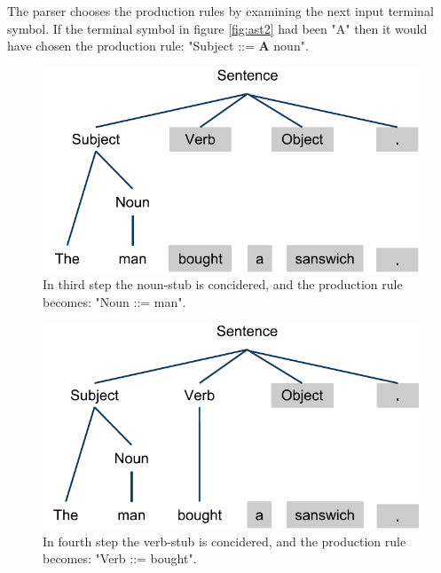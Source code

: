 The parser chooses the production rules by examining the next input terminal symbol. If the terminal symbol in figure \ref{fig:ast2} had been "A" then it would have chosen the production rule: "Subject ::= \textbf{A} noun".

\begin{figure}[H]
\begin{center}
\includegraphics[scale=0.5]{Images/parsingexample/AST3.png}
\end{center}
\caption{In third step the noun-stub is concidered, and the production rule becomes: "Noun ::= man".}
\end{figure}

\begin{figure}[H]
\begin{center}
\includegraphics[scale=0.5]{Images/parsingexample/AST4.png}
\end{center}
\caption{In fourth step the verb-stub is concidered, and the production rule becomes: "Verb ::= bought".}
\end{figure}

